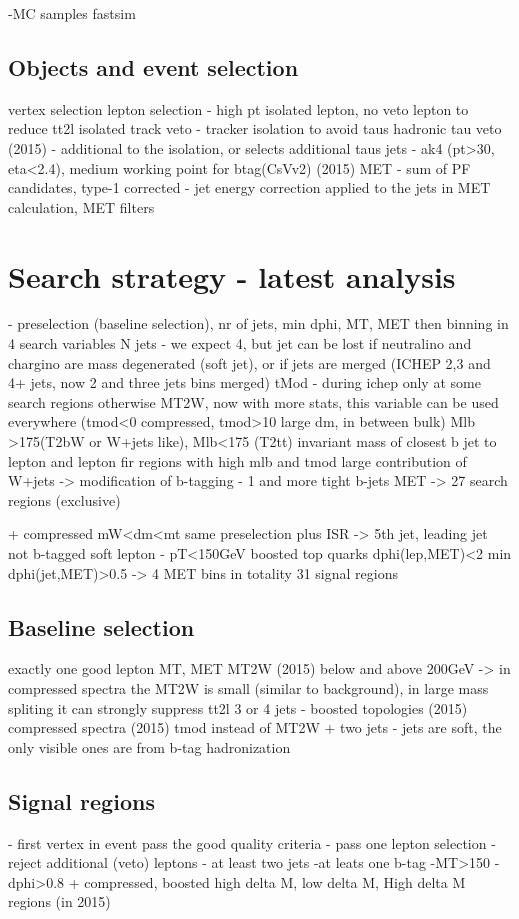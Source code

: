 -MC samples
	fastsim

\subsection{Objects and event selection}
	vertex selection 
	lepton selection - high pt isolated lepton, no veto lepton to reduce tt2l
	isolated track veto - tracker isolation to avoid taus
	hadronic tau veto (2015) - additional to the isolation, or selects additional taus
	jets - ak4 (pt>30, eta<2.4), medium working point for btag(CsVv2) (2015)
	MET - sum of PF candidates, type-1 corrected - jet energy correction applied to the jets in MET calculation, MET filters


\section{Search strategy - latest analysis}
- preselection (baseline selection), nr of jets, min dphi, MT, MET
then binning in 4 search variables
	N jets - we expect 4, but jet can be lost if neutralino and chargino are mass degenerated (soft jet), or if jets are merged
        	(ICHEP 2,3 and 4+ jets, now 2 and three jets bins merged)
	tMod - during ichep only at some search regions otherwise MT2W, now with more stats, this variable can be used everywhere (tmod<0 compressed, tmod>10 large dm, in between bulk)
	Mlb >175(T2bW or W+jets like), Mlb<175 (T2tt) invariant mass of closest b jet to lepton and lepton
		fir regions with high mlb and tmod large contribution of W+jets -> modification of b-tagging - 1 and more tight b-jets
	MET
	-> 27 search regions (exclusive)

+ compressed mW<dm<mt
	same preselection plus
	ISR -> 5th jet, leading jet not b-tagged
	soft lepton - pT<150GeV
	boosted top quarks dphi(lep,MET)<2
	min dphi(jet,MET)>0.5
        -> 4 MET bins
in totality 31 signal regions

\subsection{Baseline selection}
	exactly one good lepton
	MT, MET
	MT2W (2015) below and above 200GeV -> in compressed spectra the MT2W is small (similar to background), in large mass spliting it can strongly suppress tt2l
	3 or 4 jets - boosted topologies (2015)
        compressed spectra (2015) tmod instead of MT2W + two jets - jets are soft, the only visible ones are from b-tag hadronization

\subsection{Signal regions}
	- first vertex in event pass the good quality criteria
	- pass one lepton selection
	- reject additional (veto) leptons
	- at least two jets
	-at leats one b-tag
	-MT>150
	-dphi>0.8
	+ compressed, boosted high delta M, low delta M, High delta M regions (in 2015)

